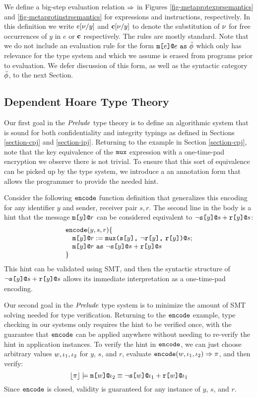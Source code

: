 \metaprotexprsemanticsfig

We define a big-step evaluation relation $\Rightarrow$ in Figures
\ref{fig-metaprotexprsemantics} and \ref{fig-metaprotinstrsemantics}
for expressions and instructions, respectively.  In this definition we
write $e[\nu/y]$ and $\mathbf{c}[\nu/y]$ to denote the substitution of
$\nu$ for free occurrences of $y$ in $e$ or $\mathbf{c}$ respectively. The
rules are mostly standard. Note that we do not include an evaluation
rule for the form $\texttt{m[}e\texttt{]}\texttt{@}e\ \texttt{as}\ \breve{\phi}$ which only has
relevance for the type system and which we assume is erased from
programs prior to evaluation. We defer discussion of this form,
as well as the syntactic category $\breve{\phi}$, to the next
Section.


\metaprotinstrsemanticsfig

\subsection{Dependent Hoare Type Theory}

Our first goal in the $\mathit{Prelude}$ type theory is to define an
algorithmic system that is sound for both confidentiality and
integrity typings as defined in Sections \ref{section-cpj} and
\ref{section-ipj}. Returning to the example in Section
\ref{section-cpj}, note that the key equivalence of the $\texttt{mux}$
expression with a one-time-pad encryption we observe there
is not trivial. To ensure that this sort of equivalence
can be picked up by the type system, we introduce a
an annotation form that allows the programmer to provide
the needed hint.

Consider the following $\texttt{encode}$ function definition that
generalizes this encoding for any identifier $y$ and sender, receiver
pair $s,r$. The second line in the body is a hint that
the message $\texttt{m[}y\texttt{]}\texttt{@}r$ can be considered equivalent to
$\neg\texttt{s[}y\texttt{]}\texttt{@}s + \texttt{r[}y\texttt{]}\texttt{@}s$:
$$
\begin{array}{l}
\texttt{encode}(y,s,r) \{\\
\quad \texttt{m[}y\texttt{]}\texttt{@}r := \texttt{mux(} \texttt{s[}y\texttt{]} \texttt{,}\ \neg\texttt{r[}y\texttt{]} \texttt{,}\ \texttt{r[}y\texttt{]} \texttt{)}\texttt{@}s;\\
\quad \texttt{m[}y\texttt{]}\texttt{@}r\ \texttt{as}\ \neg\texttt{s[}y\texttt{]}\texttt{@}s + \texttt{r[}y\texttt{]}\texttt{@}s\\
\}
\end{array}
$$
This hint can be validated using SMT, and then the
syntactic structure of $\neg\texttt{s[}y\texttt{]}\texttt{@}s + \texttt{r[}y\texttt{]}\texttt{@}s$
allows its immediate interpretation as a one-time-pad encoding.

Our second goal in the $\mathit{Prelude}$ type system is to minimize the
amount of SMT solving needed for type verification.  Returning to the
$\texttt{encode}$ example, type checking in our systems only requires the
hint to be verified once, with the guarantee that $\texttt{encode}$ can
be applied anywhere without needing to re-verify the hint in
application instances. To verify the hint in $\texttt{encode}$, we can
just choose arbitrary values $w,\iota_1,\iota_2$ for $y$, $s$, and $r$,
evaluate $\texttt{encode}(w,\iota_1,\iota_2) \Rightarrow \pi$, and then verify:
$$\lfloor \pi \rfloor \models \texttt{m[}w\texttt{]}\texttt{@}\iota_2 \equiv
\neg\texttt{s[}w\texttt{]}\texttt{@}\iota_1 + \texttt{r[}w\texttt{]}\texttt{@}\iota_1$$ 
Since $\texttt{encode}$ is closed, validity is guaranteed for
any instance of $y$, $s$, and $r$.

